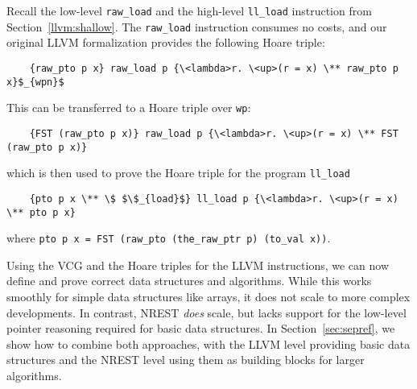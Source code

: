 \documentclass[acmsmall]{acmart}
\newcommand{\is}{\lstinline[language=isabelle]}
\begin{document}
\begin{example}
Recall the low-level \is{raw_load} and the high-level \is{ll_load} instruction from Section~\ref{llvm:shallow}.
The \is{raw_load} instruction consumes no costs, and our original LLVM formalization provides the following Hoare triple:
\begin{lstlisting}
    {raw_pto p x} raw_load p {\<lambda>r. \<up>(r = x) \** raw_pto p x}$_{wpn}$
\end{lstlisting}
This can be transferred to a Hoare triple over \is{wp}: 
\begin{lstlisting}
    {FST (raw_pto p x)} raw_load p {\<lambda>r. \<up>(r = x) \** FST (raw_pto p x)}
\end{lstlisting}
which is then used to prove the Hoare triple for the program \is{ll_load}
\begin{lstlisting}
    {pto p x \** \$ $\$_{load}$} ll_load p {\<lambda>r. \<up>(r = x) \** pto p x}
\end{lstlisting}
where \is{pto p x = FST (raw_pto (the_raw_ptr p) (to_val x))}.
\end{example}
%
%
%
%
%
Using the VCG and the Hoare triples for the LLVM instructions, we can now define and prove correct data structures and algorithms. 
While this works smoothly for simple data structures like arrays, it does not scale to more complex developments.
In contrast, NREST \emph{does} scale, but lacks support for the low-level pointer reasoning required for basic data structures.
In Section~\ref{sec:sepref}, we show how to combine both approaches,
with the LLVM level providing basic data structures and the NREST level using them as building blocks for larger algorithms.




\end{document}
